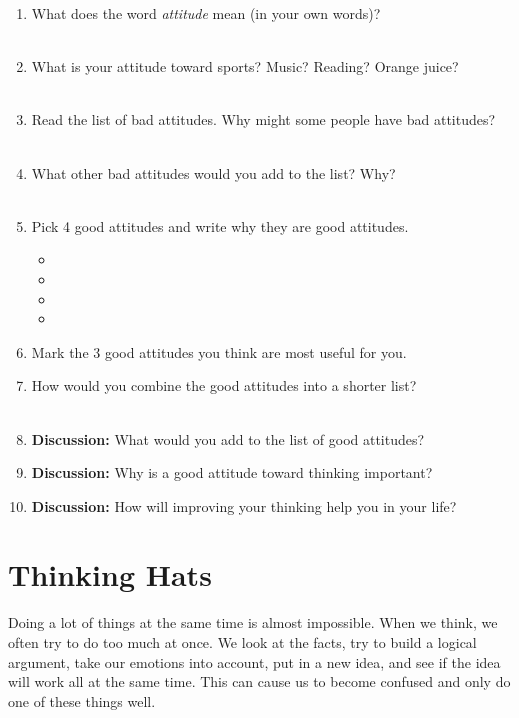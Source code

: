 \begin{enumerate}
	\item What does the word \textit{attitude} mean (in your own words)? \\\\
	\item What is your attitude toward sports? Music? Reading? Orange juice? \\\\
	\item Read the list of bad attitudes. Why might some people have bad attitudes? \\\\
	\item What other bad attitudes would you add to the list? Why? \\\\
	\item Pick 4 good attitudes and write why they are good attitudes.
	\begin{itemize}
		\item 
		\item
		\item 
		\item 
	\end{itemize}
	\item Mark the 3 good attitudes you think are most useful for you.
	\item How would you combine the good attitudes into a shorter list? \\\\
	\item \textbf{Discussion:} What would you add to the list of good attitudes?
	\item \textbf{Discussion:} Why is a good attitude toward thinking important?
	\item \textbf{Discussion:} How will improving your thinking help you in your life?
\end{enumerate}



\chapter{Thinking Hats}


Doing a lot of things at the same time is almost impossible. When we think, we often try to do too much at once. We look at the facts, try to build a logical argument, take our emotions into account, put in a new idea, and see if the idea will work all at the same time. This can cause us to become confused and only do one of these things well.

